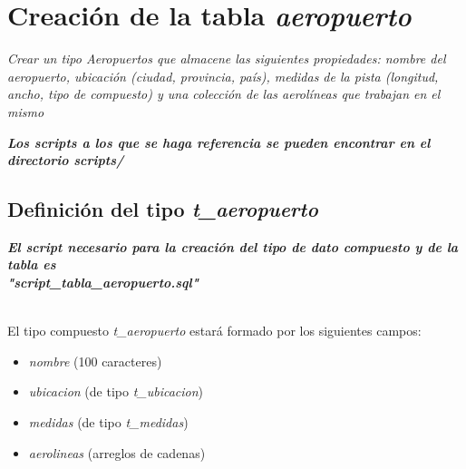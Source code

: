 







\clearpage
\tableofcontents
\clearpage 

\section{Creación de la tabla \emph{aeropuerto}}

\emph{Crear un tipo Aeropuertos que almacene las siguientes propiedades: nombre del aeropuerto, ubicación (ciudad, provincia, país), medidas de la pista (longitud, ancho, tipo de compuesto) y una colección de las aerolíneas que trabajan en el mismo} 

\emph{\textbf{Los scripts a los que se haga referencia se pueden encontrar en el directorio scripts/}} 

\subsection{Definición del tipo \emph{t\_aeropuerto}}

\emph{\textbf{El script necesario para la creación del tipo de dato compuesto y de la tabla es \\ "script\_tabla\_aeropuerto.sql"}} 

~\\

El tipo compuesto \emph{t\_aeropuerto} estará formado por los siguientes campos:
\begin{itemize}
    \item \emph{nombre} (100 caracteres) 
    \item \emph{ubicacion} (de tipo \emph{t\_ubicacion}) 
    \item \emph{medidas} (de tipo \emph{t\_medidas}) 
    \item \emph{aerolineas} (arreglos de cadenas) 
\end{itemize}

